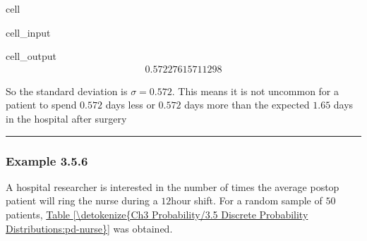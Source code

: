\documentclass[letterpaper,10pt,english]{jupyterBook}
\begin{document}
\begin{sphinxuseclass}{cell}\begin{sphinxVerbatimInput}

\begin{sphinxuseclass}{cell_input}
\begin{sphinxVerbatim}[commandchars=\\\{\}]
\end{sphinxVerbatim}

\end{sphinxuseclass}\end{sphinxVerbatimInput}
\begin{sphinxVerbatimOutput}

\begin{sphinxuseclass}{cell_output}\begin{equation*}
\begin{split}0.57227615711298\end{split}
\end{equation*}
\end{sphinxuseclass}\end{sphinxVerbatimOutput}

\end{sphinxuseclass}
\sphinxAtStartPar
So the standard deviation is \(\sigma = 0.572\). This means it is not uncommon for a patient to spend \(0.572\) days less or \(0.572\) days more than the expected \(1.65\) days in the hospital after surgery


\bigskip\hrule\bigskip



\subsubsection{Example 3.5.6}
\label{\detokenize{Ch3 Probability/3.5 Discrete Probability Distributions:example-3-5-6}}
\sphinxAtStartPar
A hospital researcher is interested in the number of times the average post\sphinxhyphen{}op patient will ring the nurse during a \(12\)\sphinxhyphen{}hour shift. For a random sample of \(50\) patients, \hyperref[\detokenize{Ch3 Probability/3.5 Discrete Probability Distributions:pd-nurse}]{Table \ref{\detokenize{Ch3 Probability/3.5 Discrete Probability Distributions:pd-nurse}}} was obtained.
\end{document}
